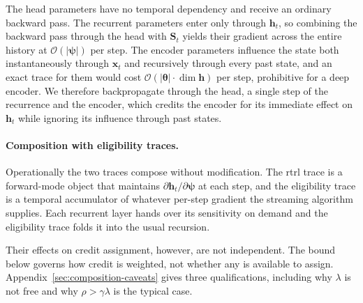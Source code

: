 \documentclass{article}
\begin{document}
The head parameters have no temporal dependency and receive an ordinary
backward pass. The recurrent parameters enter only through
$\boldsymbol{h}_t$, so combining the backward pass through the head with
$\boldsymbol{S}_t$ yields their gradient across the entire history at
$\mathcal{O}(|\boldsymbol{\psi}|)$ per step. The encoder parameters influence the state both
instantaneously through $\boldsymbol{x}_t$ and recursively through every past state, and an
exact trace for them would cost
$\mathcal{O}(|\boldsymbol{\theta}|\cdot\dim \boldsymbol{h})$ per step, prohibitive for a deep
encoder. We therefore backpropagate through the head, a single step of the recurrence and the
encoder, which credits the encoder for its immediate effect on $\boldsymbol{h}_t$ while ignoring
its influence through past states.

\paragraph{Composition with eligibility traces.}
Operationally the two traces compose without modification. The \gls{rtrl} trace is a
forward-mode object that maintains $\partial \boldsymbol{h}_t / \partial \boldsymbol{\psi}$ at
each step, and the eligibility trace is a temporal accumulator of whatever per-step gradient the
streaming algorithm supplies. Each recurrent layer hands over its sensitivity on demand and the
eligibility trace folds it into the usual recursion.

Their effects on credit assignment, however, are not independent. The bound below governs how
credit is weighted, not whether any is available to assign.
Appendix~\ref{sec:composition-caveats} gives three qualifications, including why $\lambda$ is not
free and why $\rho > \gamma\lambda$ is the typical case.
\end{document}
